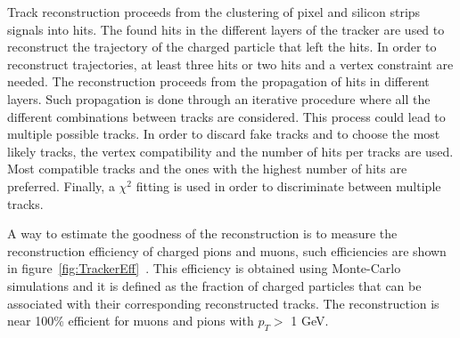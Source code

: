 Track reconstruction proceeds from the clustering of pixel and silicon strips signals into hits. The found hits in the different layers of the tracker are used to reconstruct the trajectory of the charged particle that left the hits. In order to reconstruct trajectories, at least three hits or two hits and a vertex constraint are needed. The reconstruction proceeds from the propagation of hits in different layers. Such propagation is done through an iterative procedure where all the different combinations between tracks are considered. This process could lead to multiple possible tracks. In order to discard fake tracks and to choose the most likely tracks, the vertex compatibility and the number of hits per tracks are used. Most compatible tracks and the ones with the highest number of hits are preferred. Finally, a $\chi^{2}$ fitting is used in order to discriminate between multiple tracks. 

A way to estimate the goodness of the reconstruction is to measure the reconstruction efficiency of charged pions and muons, such efficiencies are shown in figure~\ref{fig:TrackerEff}~\cite{Chatrchyan:2014fea}. This efficiency is obtained using Monte-Carlo simulations and it is defined as the fraction of charged particles that can be associated with their corresponding reconstructed tracks. The reconstruction is near 100\% efficient for muons and pions with $p_{T}>$ 1 GeV.

